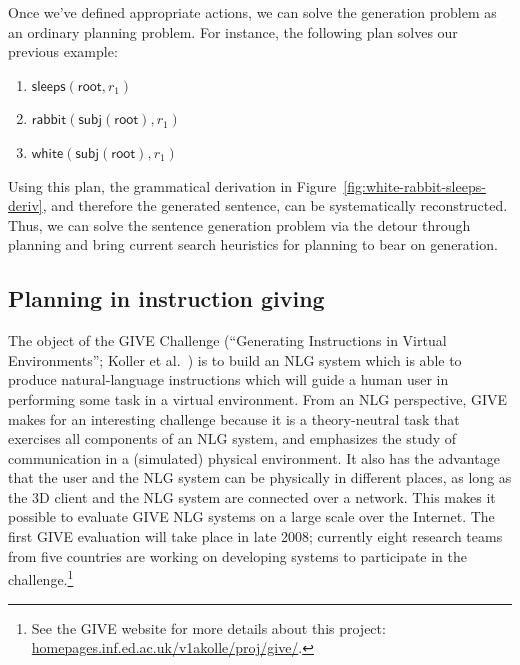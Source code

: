 Once we've defined appropriate actions, we can solve the generation
problem as an ordinary planning problem. For instance, the following plan
solves our previous example:
%
\begin{enumerate}
\item $\mathsf{sleeps}(\mathsf{root}, r_1)$
\item $\mathsf{rabbit}(\mathsf{subj}(\mathsf{root}), r_1)$
\item $\mathsf{white}(\mathsf{subj}(\mathsf{root}), r_1)$
\end{enumerate}
%
Using this plan, the grammatical derivation in
Figure~\ref{fig:white-rabbit-sleeps-deriv}, and therefore the generated
sentence, can be systematically reconstructed. Thus, we can solve the
sentence generation problem via the detour through planning and bring
current search heuristics for planning to bear on generation.



\subsection{Planning in instruction giving}

The object of the GIVE Challenge (``Generating Instructions in Virtual
Environments''; Koller et al.\ \citeyear{alexander07:_shared_task_propos})
is to build an NLG system which is able to produce natural-language
instructions which will guide a human user in performing some task in a
virtual environment. From an NLG perspective, GIVE makes for an
interesting challenge because it is a theory-neutral task that exercises
all components of an NLG system, and emphasizes the study of communication
in a (simulated) physical environment. It also has the advantage that the
user and the NLG system can be physically in different places, as long as
the 3D client and the NLG system are connected over a network. This makes
it possible to evaluate GIVE NLG systems on a large scale over the
Internet. The first GIVE evaluation will take place in late 2008;
currently eight research teams from five countries are working on
developing systems to participate in the challenge.\footnote{See the GIVE
 website for more details about this project:
 \url{homepages.inf.ed.ac.uk/v1akolle/proj/give/}.}


